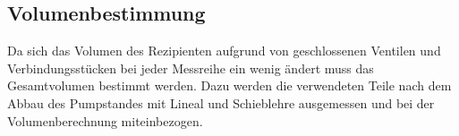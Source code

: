 \subsection{Volumenbestimmung}
Da sich das Volumen des Rezipienten aufgrund von geschlossenen Ventilen und Verbindungsstücken
bei jeder Messreihe ein wenig ändert muss das Gesamtvolumen bestimmt werden. Dazu werden
die verwendeten Teile nach dem Abbau des Pumpstandes mit Lineal und Schieblehre ausgemessen
und bei der Volumenberechnung miteinbezogen.
